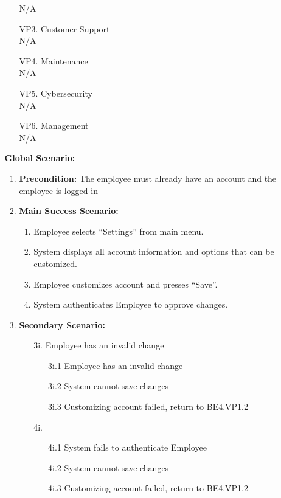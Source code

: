 \documentclass[]{article}
\begin{document}
\begin{enumerate}[{\bf BE1.}]
\begin{enumerate}[{\bf BE4.}]
\begin{enumerate}
            \indent N/A 
            \item[VP3.] Customer Support \\
            \indent N/A 
            \item[VP4.] Maintenance \\
            \indent N/A 
            \item[VP5.] Cybersecurity \\
            \indent N/A 
            \item[VP6.] Management \\
            \indent N/A 
        \end{enumerate}
        {\bf Global Scenario:}\\
        \begin{enumerate}
            \item \textbf{Precondition:} The employee must already have an account and the employee is logged in
            \item \textbf{Main Success Scenario:}
            \begin{enumerate}
                \item Employee selects “Settings” from main menu. 
                \item System displays all account information and options that can be customized. 
                \item Employee customizes account and presses “Save”. 
                \item System authenticates Employee to approve changes. 
            \end{enumerate}
            \item \textbf{Secondary Scenario:}
            \begin{enumerate}
                \item[3i.] Employee has an invalid change
                \begin{enumerate}
                    \item[3i.1] Employee has an invalid change
                    \item[3i.2] System cannot save changes
                    \item[3i.3] Customizing account failed, return to BE4.VP1.2
                \end{enumerate}
                \item[4i.]
                \begin{enumerate}
                    \item[4i.1] System fails to authenticate Employee
                    \item[4i.2] System cannot save changes
                    \item[4i.3] Customizing account failed, return to BE4.VP1.2
                \end{enumerate}
            \end{enumerate}
        \end{enumerate}
\end{enumerate}



\end{enumerate}
\end{document}
